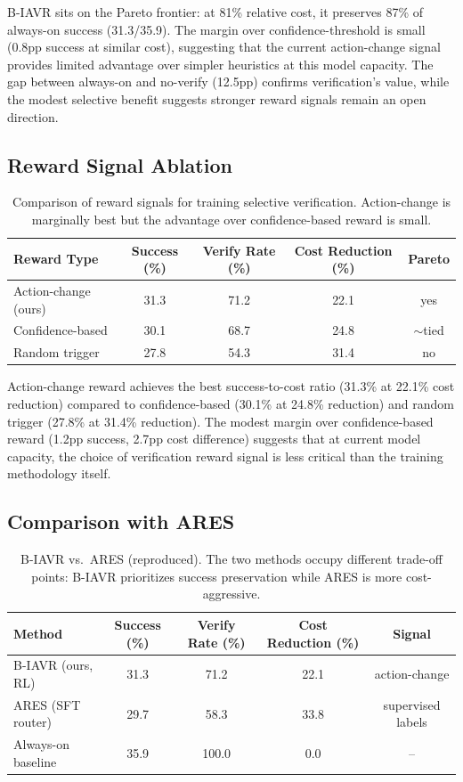 \documentclass{article}
\begin{document}
B-IAVR sits on the Pareto frontier: at 81\% relative cost, it preserves 87\% of always-on success (31.3/35.9). The margin over confidence-threshold is small (0.8pp success at similar cost), suggesting that the current action-change signal provides limited advantage over simpler heuristics at this model capacity. The gap between always-on and no-verify (12.5pp) confirms verification's value, while the modest selective benefit suggests stronger reward signals remain an open direction.

\subsection{Reward Signal Ablation}

\begin{table}[h]
\centering
\caption{Comparison of reward signals for training selective verification. Action-change is marginally best but the advantage over confidence-based reward is small.}
\begin{tabular}{lcccc}
\toprule
Reward Type & Success (\%) & Verify Rate (\%) & Cost Reduction (\%) & Pareto \\
\midrule
Action-change (ours) & 31.3 & 71.2 & 22.1 & yes \\
Confidence-based & 30.1 & 68.7 & 24.8 & $\sim$tied \\
Random trigger & 27.8 & 54.3 & 31.4 & no \\
\bottomrule
\end{tabular}
\label{tab:reward}
\end{table}

Action-change reward achieves the best success-to-cost ratio (31.3\% at 22.1\% cost reduction) compared to confidence-based (30.1\% at 24.8\% reduction) and random trigger (27.8\% at 31.4\% reduction). The modest margin over confidence-based reward (1.2pp success, 2.7pp cost difference) suggests that at current model capacity, the choice of verification reward signal is less critical than the training methodology itself.

\subsection{Comparison with ARES}

\begin{table}[h]
\centering
\caption{B-IAVR vs.\ ARES (reproduced). The two methods occupy different trade-off points: B-IAVR prioritizes success preservation while ARES is more cost-aggressive.}
\begin{tabular}{lcccc}
\toprule
Method & Success (\%) & Verify Rate (\%) & Cost Reduction (\%) & Signal \\
\midrule
B-IAVR (ours, RL) & 31.3 & 71.2 & 22.1 & action-change \\
ARES (SFT router) & 29.7 & 58.3 & 33.8 & supervised labels \\
Always-on baseline & 35.9 & 100.0 & 0.0 & -- \\
\bottomrule
\end{tabular}
\label{tab:ares}
\end{table}
\end{document}
